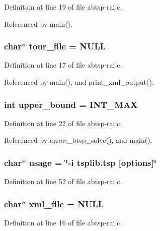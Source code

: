 Definition at line 19 of file abtsp-rai.c.

Referenced by main().\hypertarget{abtsp-rai_8c_b818a82f867be75d7c4d92d792b0943e}{
\subsubsection[{tour\_\-file}]{\setlength{\rightskip}{0pt plus 5cm}char$\ast$ {\bf tour\_\-file} = NULL}}
\label{abtsp-rai_8c_b818a82f867be75d7c4d92d792b0943e}




Definition at line 17 of file abtsp-rai.c.

Referenced by main(), and print\_\-xml\_\-output().\hypertarget{abtsp-rai_8c_f5a34eb1d01ffd792adcadc9627ffcb8}{
\subsubsection[{upper\_\-bound}]{\setlength{\rightskip}{0pt plus 5cm}int {\bf upper\_\-bound} = INT\_\-MAX}}
\label{abtsp-rai_8c_f5a34eb1d01ffd792adcadc9627ffcb8}




Definition at line 22 of file abtsp-rai.c.

Referenced by arrow\_\-btsp\_\-solve(), and main().\hypertarget{abtsp-rai_8c_adebe2487a2c5240ab6cd02c83add0bf}{
\subsubsection[{usage}]{\setlength{\rightskip}{0pt plus 5cm}char$\ast$ {\bf usage} = \char`\"{}-i tsplib.tsp \mbox{[}{\bf options}\mbox{]}\char`\"{}}}
\label{abtsp-rai_8c_adebe2487a2c5240ab6cd02c83add0bf}




Definition at line 52 of file abtsp-rai.c.\hypertarget{abtsp-rai_8c_bf4e392494984c6ef8259268eb1fe421}{
\subsubsection[{xml\_\-file}]{\setlength{\rightskip}{0pt plus 5cm}char$\ast$ {\bf xml\_\-file} = NULL}}
\label{abtsp-rai_8c_bf4e392494984c6ef8259268eb1fe421}




Definition at line 16 of file abtsp-rai.c.